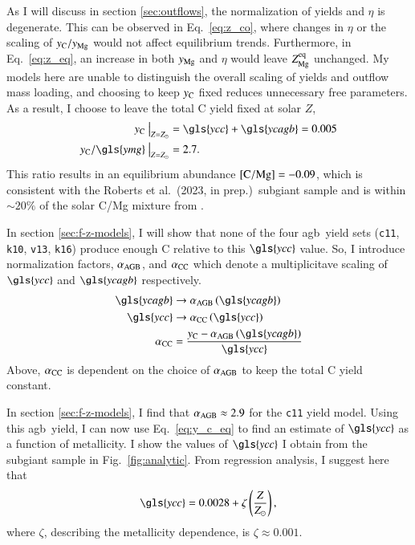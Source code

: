 \documentclass[12pt,oneside,letterpaper]{report}
\newcommand{\agb}{\gls{agb}}
\newcommand{\cxi}{\texttt{\gls{c11}}}
\newcommand{\kx}{\texttt{\gls{k10}}}
\newcommand{\kxvi}{\texttt{\gls{k16}}}
\newcommand{\vxiii}{\texttt{\gls{v13}}}
\newcommand{\Ycc}{\gls{ycc}}
\newcommand{\Yoc}{\gls{ymg}}
\newcommand{\Ycagb}{\gls{ycagb}}
\newcommand{\Yct}{\ensuremath{y_{\rm C}}}
\newcommand{\citetjack}{Roberts et al.~(2023, in prep.)}
\newcommand{\about}[1]{${\sim} #1$}
\begin{document}
As I will discuss in section \ref{sec:outflows}, the normalization of yields and $\eta$ is degenerate. This can be observed in Eq.~\ref{eq:z_co}, where changes in $\eta$ or the scaling of $y_{\rm C}/y_{\rm Mg}$ would not affect equilibrium trends. Furthermore, in Eq.~\ref{eq:z_eq}, an increase in both $y_{\rm Mg}$ and $\eta$ would leave $Z_{\rm Mg}^{\rm eq}$ unchanged. My models here are unable to distinguish the overall scaling of yields and outflow mass loading, and choosing to keep $y_{\rm C}$ fixed reduces unnecessary free parameters. 
%
As a result, I choose to leave the total C yield fixed at solar $Z$,
\begin{subequations}
    \begin{align}
        \Yct~\big\vert_{Z=Z_\odot} &= \Ycc + \Ycagb = 0.005 \\
        \Yct/\Yoc~\big\vert_{Z=Z_\odot} &= 2.7.
    \end{align}
\end{subequations}
This ratio results in an equilibrium abundance ${\rm [C/Mg]} = -0.09$, which is consistent with the \citetjack~\gls{subgiant} sample and is within \about{20\%} of the solar C/Mg mixture from \citet{asplund+09}.

In section \ref{sec:f-z-models}, I will show that none of the four \agb\ yield sets (\cxi{}, \kx{}, \vxiii{}, \kxvi{}) produce enough C relative to this $\Ycc$ value. So, I introduce normalization factors, $\alpha_{\rm AGB}$, and $\alpha_{\rm CC}$ which denote a multiplicitave scaling of $\Ycc$ and $\Ycagb$ respectively. 
\begin{subequations} \label{eq:alpha}
    \begin{align}
        \Ycagb &\rightarrow \alpha_{\rm AGB} \left(\Ycagb\right) \\
        \Ycc &\rightarrow \alpha_{\rm CC} \left(\Ycc\right)\\
        \alpha_{\rm CC} &= \frac{\Yct - \alpha_{\rm AGB} \left(\Ycagb\right)}{\Ycc}
    \end{align}
\end{subequations}
Above, $\alpha_{\rm CC}$ is dependent on the choice of $\alpha_{\rm AGB}$ to keep the total C yield constant. 

In section \ref{sec:f-z-models}, I find that $\alpha_{\rm AGB}\approx 2.9$ for the \cxi{} yield model. Using this \agb\ yield, I can now use Eq.~\ref{eq:y_c_eq} to find an estimate of $\Ycc$ as a function of metallicity. I show the values of $\Ycc$ I obtain from the \gls{subgiant} sample in Fig.~\ref{fig:analytic}. From regression analysis, I suggest here that
\begin{equation}\label{eq:zeta}
    \Ycc = 0.0028 + \zeta\left(\frac{Z}{Z_\odot}\right),
\end{equation}
where $\zeta$, describing the metallicity dependence, is $\zeta\approx0.001$.
\end{document}
